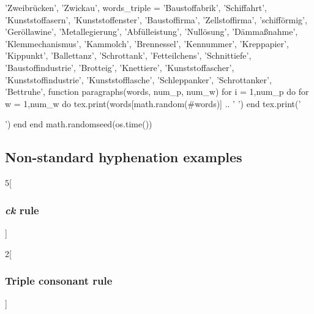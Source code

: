 \documentclass{article}
\begin{document}
{{      'Zweibrücken',
      'Zwickau',
    }
    words_triple = {
      'Baustoffabrik',
      'Schiffahrt',
      'Kunststoffasern',
      'Kunststoffenster',
      'Baustoffirma',
      'Zellstoffirma',
      'schifförmig',
      'Geröllawine',
      'Metallegierung',
      'Abfülleistung',
      'Nullösung',
      'Dämmaßnahme',
      'Klemmechanismus',
      'Kammolch',
      'Brennessel',
      'Kennummer',
      'Kreppapier',
      'Kippunkt',
      'Ballettanz',
      'Schrottank',
      'Fetteilchens',
      'Schnittiefe',
      'Baustoffindustrie',
      'Brotteig',
      'Knettiere',
      'Kunststoffascher',
      'Kunststoffindustrie',
      'Kunststofflasche',
      'Schleppanker',
      'Schrottanker',
      'Bettruhe',
   }
   function paragraphs(words, num_p, num_w)
      for i = 1,num_p do
         for w = 1,num_w do
            tex.print(words[math.random(#words)] .. ' ')
         end
         tex.print('\par')
      end
   end
   math.randomseed(os.time())
}

\subsection{Non-standard hyphenation examples}

\begin{multicols}{5}[\subsubsection{\emph{ck} rule}]
\end{multicols}

\begin{multicols}{2}[\subsubsection{Triple consonant rule}]
\end{multicols}

\begin{otherlanguage}{german}
\end{otherlanguage}
\end{document}

